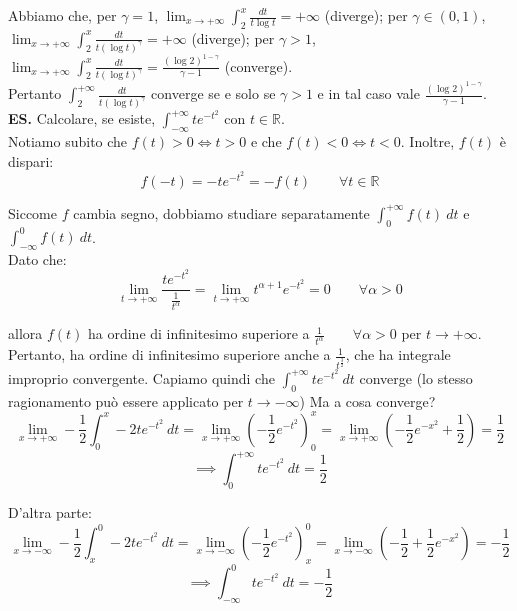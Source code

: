 \documentclass{article}
\begin{document}
\noindent Abbiamo che, per $\gamma = 1$, $\lim_{x \to +\infty} \int_2^x \frac{dt}{t\log t} = +\infty$ (diverge); per $\gamma \in (0, 1)$, $\lim_{x \to +\infty} \int_2^x \frac{dt}{t(\log t)^\gamma} = +\infty$ (diverge); per $\gamma > 1$, $\lim_{x \to +\infty} \int_2^x \frac{dt}{t(\log t)^\gamma} = \frac{(\log 2)^{1 - \gamma}}{\gamma - 1}$  (converge).\\
Pertanto $\int_2^{+\infty} \frac{dt}{t(\log t)^\gamma}$ converge se e solo se $\gamma > 1$ e in tal caso vale $\frac{(\log 2)^{1 - \gamma}}{\gamma - 1}$.\\

\noindent\textbf{ES.} Calcolare, se esiste, $\int_{-\infty}^{+\infty} te^{-t^2}$ con $t \in \mathbb{R}$. \\
Notiamo subito che $f(t) > 0 \iff t > 0$ e che $f(t) < 0 \iff t < 0$. Inoltre, $f(t)$ è dispari:
\begin{equation*}
    f(-t) = -te^{-t^2} = -f(t) \qquad \forall t \in \mathbb{R}
\end{equation*}

\noindent Siccome $f$ cambia segno, dobbiamo studiare separatamente $\int_0^{+\infty} f(t) \ dt$ e $\int_{-\infty}^0 f(t) \ dt$. \\
Dato che:
\begin{equation*}
    \lim_{t \to +\infty} \frac{te^{-t^2}}{\frac{1}{t^\alpha}} = \lim_{t \to +\infty} t^{\alpha + 1}e^{-t^2} = 0 \qquad \forall \alpha > 0
\end{equation*}

\noindent allora $f(t)$ ha ordine di infinitesimo superiore a $\frac{1}{t^\alpha} \qquad \forall \alpha > 0$ per $t \to +\infty$. Pertanto, ha ordine di infinitesimo superiore anche a $\frac{1}{t^\frac{3}{2}}$, che ha integrale improprio convergente. Capiamo quindi che $\int_0^{+\infty} te^{-t^2} \ dt$ converge (lo stesso ragionamento può essere applicato per $t \to -\infty$) Ma a cosa converge?
\begin{equation*}
    \lim_{x \to +\infty} -\frac{1}{2} \int_0^x -2te^{-t^2} \ dt = \lim_{x \to +\infty} \left(-\frac{1}{2}e^{-t^2}\right)_0^x = \lim_{x \to +\infty} \left(-\frac{1}{2}e^{-x^2} + \frac{1}{2}\right) = \frac{1}{2}
\end{equation*}
\begin{equation*}
    \implies \int_0^{+\infty} te^{-t^2} \ dt = \frac{1}{2}
\end{equation*}

\noindent D'altra parte: 
\begin{equation*}
    \lim_{x \to -\infty} -\frac{1}{2} \int_x^0 -2te^{-t^2} \ dt = \lim_{x \to -\infty} \left(-\frac{1}{2}e^{-t^2}\right)_x^0 = \lim_{x \to -\infty} \left(-\frac{1}{2} + \frac{1}{2}e^{-x^2}\right) = -\frac{1}{2}
\end{equation*}
\begin{equation*}
    \implies \int_{-\infty}^0 te^{-t^2} \ dt = -\frac{1}{2}
\end{equation*}
\end{document}
